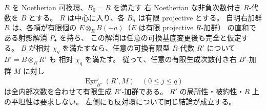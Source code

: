 \begin{lemma}
\label{lem:chi-finite-type-basechange}
$R$ を Noetherian 可換環、$B_0=R$ を満たす
右 Noetherian な非負次数付き $R$-代数を $B$ とする。
$R$ は中心に入り、各 $B_n$ は有限 projective とする。
自明右加群 $R$ は、各項が有限個の
$E\otimes_R B(-a)$（$E$ は有限 projective $R$-加群）
の直和である射影解消 $P_\bullet$ を持ち、
この解消は任意の可換基底変更後も完全と仮定する。
$B$ が相対 $\chi_q$ を満たすなら、任意の可換有限型
$R$-代数 $R'$ について $B'=B\otimes_RR'$ も
相対 $\chi_q$ を満たす。
従って、任意の有限生成次数付き右 $B'$-加群 $M$ に対し
\[
 \underline{\operatorname{Ext}}_{B'}^j(R',M)
 \quad(0\le j\le q)
\]
は全内部次数を合わせて有限生成 $R'$-加群である。
$R'$ の局所性・被約性・$R$ 上の平坦性は要求しない。
左側にも反対環について同じ結論が成立する。
\end{lemma}
